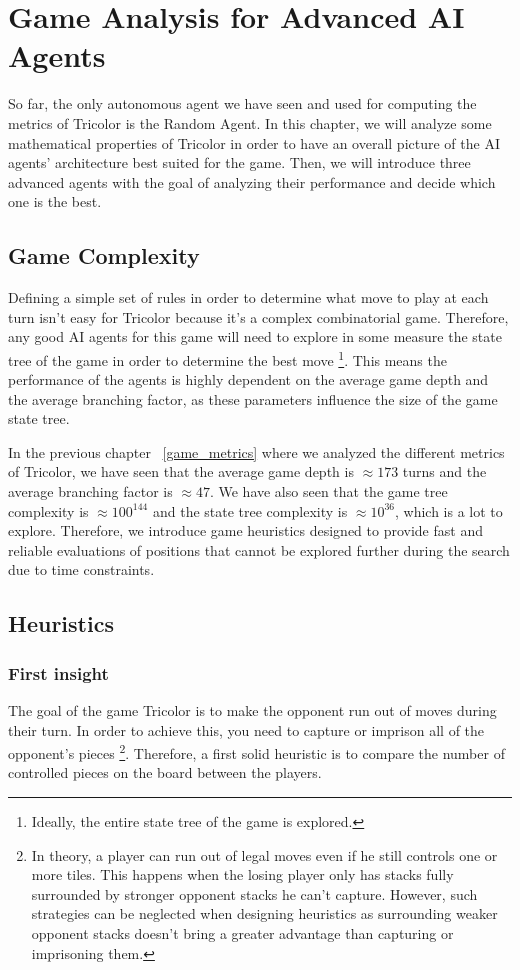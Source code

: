 \chapter{Game Analysis for Advanced AI Agents}
\label{advanced_ai_agents}

So far, the only autonomous agent we have seen and used for computing the metrics of Tricolor is the Random Agent. In this chapter, we will analyze some mathematical properties of Tricolor in order to have an overall picture of the AI agents' architecture best suited for the game. Then, we will introduce three advanced agents with the goal of analyzing their performance and decide which one is the best.

\section{Game Complexity}

Defining a simple set of rules in order to determine what move to play at each turn isn't easy for Tricolor because it's a complex combinatorial game. Therefore, any good AI agents for this game will need to explore in some measure the state tree of the game in order to determine the best move \footnote{Ideally, the entire state tree of the game is explored.}. This means the performance of the agents is highly dependent on the average game depth and the average branching factor, as these parameters influence the size of the game state tree.

In the previous chapter ~\ref{game_metrics} where we analyzed the different metrics of Tricolor, we have seen that the average game depth is $\approx 173$ turns and the average branching factor is $\approx 47$. We have also seen that the game tree complexity is $\approx 100^{144}$ and the state tree complexity is $\approx 10^{36}$, which is a lot to explore. Therefore, we introduce game heuristics designed to provide fast and reliable evaluations of positions that cannot be explored further during the search due to time constraints.

\section{Heuristics}
\label{sec:heuristics}

\subsection{First insight}

The goal of the game Tricolor is to make the opponent run out of moves during their turn. In order to achieve this, you need to capture or imprison all of the opponent's pieces \footnote{In theory, a player can run out of legal moves even if he still controls one or more tiles. This happens when the losing player only has stacks fully surrounded by stronger opponent stacks he can't capture. However, such strategies can be neglected when designing heuristics as surrounding weaker opponent stacks doesn't bring a greater advantage than capturing or imprisoning them.}. Therefore, a first solid heuristic is to compare the number of controlled pieces on the board between the players.

